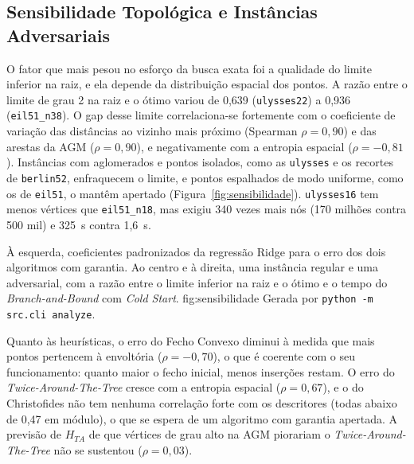\subsection{Sensibilidade Topológica e Instâncias Adversariais}
\label{sec:res_sensibilidade}

O fator que mais pesou no esforço da busca exata foi a qualidade do limite inferior na raiz, e
ela depende da distribuição espacial dos pontos. A razão entre o limite de grau 2 na raiz e o
ótimo variou de 0,639 (\texttt{ulysses22}) a 0,936 (\texttt{eil51\_n38}). O gap desse limite
correlaciona-se fortemente com o coeficiente de variação das distâncias ao vizinho mais próximo
(Spearman $\rho = 0{,}90$) e das arestas da AGM ($\rho = 0{,}90$), e negativamente com a entropia
espacial ($\rho = -0{,}81$). Instâncias com aglomerados e pontos isolados, como as
\texttt{ulysses} e os recortes de \texttt{berlin52}, enfraquecem o limite, e pontos espalhados de
modo uniforme, como os de \texttt{eil51}, o mantêm apertado (Figura~\ref{fig:sensibilidade}). \texttt{ulysses16} tem menos vértices que
\texttt{eil51\_n18}, mas exigiu 340 vezes mais nós (170 milhões contra 500 mil) e 325~s contra
1,6~s.

{À esquerda, coeficientes padronizados da regressão Ridge para o erro dos dois algoritmos com
garantia. Ao centro e à direita, uma instância regular e uma adversarial, com a razão entre o
limite inferior na raiz e o ótimo e o tempo do \textit{Branch-and-Bound} com \textit{Cold Start}.}
{fig:sensibilidade}
{Gerada por \texttt{python -m src.cli analyze}.}

Quanto às heurísticas, o erro do Fecho Convexo diminui à medida que mais pontos pertencem à
envoltória ($\rho = -0{,}70$), o que é coerente com o seu funcionamento: quanto maior o fecho
inicial, menos inserções restam. O erro do \textit{Twice-Around-The-Tree} cresce com a entropia
espacial ($\rho = 0{,}67$), e o do Christofides não tem nenhuma correlação forte com os
descritores (todas abaixo de 0,47 em módulo), o que se espera de um algoritmo com garantia
apertada. A previsão de $H_{TA}$ de que vértices de grau alto na AGM piorariam o
\textit{Twice-Around-The-Tree} não se sustentou ($\rho = 0{,}03$).

